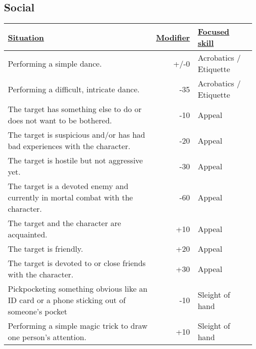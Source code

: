 \subsection{Social}
\begin{tabularx}{\textwidth}{|X|r|l|}
	\hline
	\ul{Situation} & \ul{Modifier} & \ul{Focused skill} \\ \hline
	Performing a simple dance. & +/-0 & Acrobatics / Etiquette \\ \hline
	Performing a difficult, intricate dance. & -35 & Acrobatics / Etiquette \\ \hline
	The target has something else to do or does not want to be bothered. & -10 & Appeal \\ \hline
	The target is suspicious and/or has had bad experiences with the character. & -20 & Appeal \\ \hline
	The target is hostile but not aggressive yet. & -30 & Appeal \\ \hline
	The target is a devoted enemy and currently in mortal combat with the character. & -60 & Appeal \\ \hline
	The target and the character are acquainted. & +10 & Appeal \\ \hline
	The target is friendly. & +20 & Appeal \\ \hline
	The target is devoted to or close friends with the character. & +30 & Appeal \\ \hline
	Pickpocketing something obvious like an ID card or a phone sticking out of someone's pocket & -10 & Sleight of hand \\ \hline
	Performing a simple magic trick to draw one person's attention. & +10 & Sleight of hand \\ \hline
\end{tabularx}

